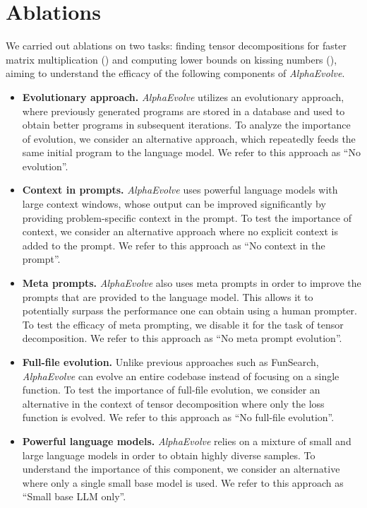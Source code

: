 \documentclass[logo,copyright,12pt]{googledeepmind}
\theoremstyle{definition}
\theoremstyle{remark}
\theoremstyle{plain}
\newcommand{\method}{\emph{AlphaEvolve}\xspace}
\begin{document}
\section{Ablations}
\label{sec:ablations_rewrite}

We carried out ablations on two tasks: finding tensor decompositions for faster matrix multiplication () and computing lower bounds on kissing numbers (), aiming to understand the efficacy of the following components of \method.

\begin{itemize}
    \item {\bf Evolutionary approach.} \method utilizes an evolutionary approach, where previously generated programs are stored in a database and used to obtain better programs in subsequent iterations. To analyze the importance of evolution, we consider an alternative approach, which repeatedly feeds the same initial program to the language model. We refer to this approach as ``No evolution''.
    \item {\bf Context in prompts.} \method uses powerful language models with large context windows, whose output can be improved significantly by providing problem-specific context in the prompt. To test the importance of context, we consider an alternative approach where no explicit context is added to the prompt. We refer to this approach as ``No context in the prompt''.
    \item {\bf Meta prompts.} \method also uses meta prompts in order to improve the prompts that are provided to the language model. This allows it to potentially surpass the performance one can obtain using a human prompter. To test the efficacy of meta prompting, we disable it for the task of tensor decomposition. We refer to this approach as ``No meta prompt evolution''.
    \item {\bf Full-file evolution.} Unlike previous approaches such as FunSearch, \method can evolve an entire codebase instead of focusing on a single function. To test the importance of full-file evolution, we consider an alternative in the context of tensor decomposition where only the loss function is evolved. We refer to this approach as ``No full-file evolution''.
    \item {\bf Powerful language models.} \method relies on a mixture of small and large language models in order to obtain highly diverse samples. To understand the importance of this component, we consider an alternative where only a single small base model is used. We refer to this approach as ``Small base LLM only''.
\end{itemize}
\end{document}
